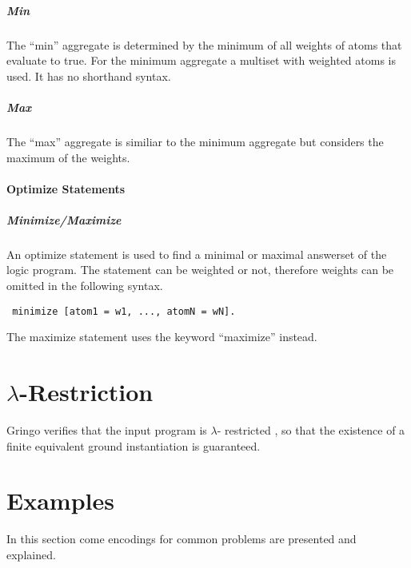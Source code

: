 \documentclass[a4paper,10pt]{article}
\begin{document}
\subparagraph{Min}
The ``min'' aggregate is determined by the minimum of all weights of atoms that evaluate to true.
For the minimum aggregate a multiset with weighted atoms is used. It has no shorthand syntax.
\subparagraph{Max}
The ``max'' aggregate is similiar to the minimum aggregate but considers the maximum of the weights.

\paragraph{Optimize Statements}

\subparagraph{Minimize/Maximize}
An optimize statement is used to find a minimal or maximal answerset of the logic program.
The statement can be weighted or not, therefore weights can be omitted in the following syntax.
\begin{verbatim}
 minimize [atom1 = w1, ..., atomN = wN].
\end{verbatim}
The maximize statement uses the keyword ``maximize'' instead.

\section{$\lambda$-Restriction}
\label{domainrestricted}
Gringo verifies that the input program is $\lambda$-
restricted \cite{gringopaper}, so that the existence of a finite equivalent ground instantiation is guaranteed.


\section{Examples}
In this section come encodings for common problems are presented and explained.
\end{document}
